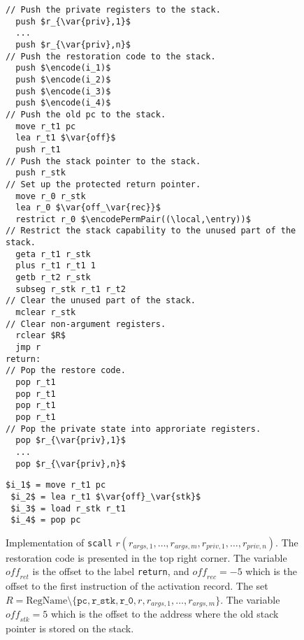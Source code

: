\documentclass[format=acmsmall, review=true, screen=true]{acmart}
\newcommand{\var}[1]{\mathit{#1}}
\newcommand{\plainfun}[2]{
  \ifthenelse{\equal{#2}{}}
  {\mathit{#1}}
  {\mathit{#1}(#2)}
}
\newcommand{\encode}{\plainfun{encode}{}}
\newcommand{\encodePermPair}{\plainfun{encodePermPair}{}}
\newcommand{\plaindom}[1]{\mathrm{#1}}
\newcommand{\RegName}{\plaindom{RegName}}
\newcommand{\plainperm}[1]{\textsc{#1}}
\newcommand{\entry}{\plainperm{e}}
\newcommand{\plainlocality}[1]{\mathrm{#1}}
\newcommand{\local}{\plainlocality{local}}
\newenvironment{toplas}{}{}
\begin{document}
\begin{toplas}
\begin{figure}[htb]
  \begin{toplas}
    \centering
    \begin{minipage}[t]{.6\linewidth}
\begin{lstlisting}
// Push the private registers to the stack.
  push $r_{\var{priv},1}$
  ...
  push $r_{\var{priv},n}$
// Push the restoration code to the stack.
  push $\encode(i_1)$
  push $\encode(i_2)$
  push $\encode(i_3)$
  push $\encode(i_4)$
// Push the old pc to the stack.
  move r_t1 pc
  lea r_t1 $\var{off}$ 
  push r_t1
// Push the stack pointer to the stack.
  push r_stk
// Set up the protected return pointer.
  move r_0 r_stk
  lea r_0 $\var{off_\var{rec}}$
  restrict r_0 $\encodePermPair((\local,\entry))$
// Restrict the stack capability to the unused part of the stack.
  geta r_t1 r_stk
  plus r_t1 r_t1 1
  getb r_t2 r_stk
  subseg r_stk r_t1 r_t2
// Clear the unused part of the stack.
  mclear r_stk
// Clear non-argument registers.
  rclear $R$
  jmp r
return:
// Pop the restore code.
  pop r_t1
  pop r_t1
  pop r_t1
  pop r_t1
// Pop the private state into approriate registers.
  pop $r_{\var{priv},1}$
  ...
  pop $r_{\var{priv},n}$
\end{lstlisting}      
    \end{minipage}
    \begin{minipage}[t]{.29\linewidth}
\begin{lstlisting}[title=\footnotesize{The restoration code used in \texttt{scall}.}, captionpos=b,frame=single,numbers=none]
 $i_1$ = move r_t1 pc
 $i_2$ = lea r_t1 $\var{off}_\var{stk}$
 $i_3$ = load r_stk r_t1
 $i_4$ = pop pc
\end{lstlisting}
    \end{minipage}%
    \caption{Implementation of \texttt{scall} $r(r_{\var{args},1},\dots,
      r_{\var{args},m},r_{\var{priv},1},\dots, r_{\var{priv},n})$. The
      restoration code is presented in the top right corner. The
      variable $\var{off}_\var{ret}$ is the offset to the label \texttt{return}, and
      $\var{off_\var{rec}} = -5$ which is the offset to the first instruction of
      the activation record. The set $R = \RegName \setminus
      \{\texttt{pc},\texttt{r\_stk},\texttt{r\_0},r,r_{\var{args},1},\dots,r_{\var{args},m}\}$.
    The variable $\var{off}_\var{stk} =5$ which is the offset to the address
    where the old stack pointer is stored on the stack.}
    \label{fig:scall-impl}
  \end{toplas}
\end{figure}


\end{toplas}
\end{document}
